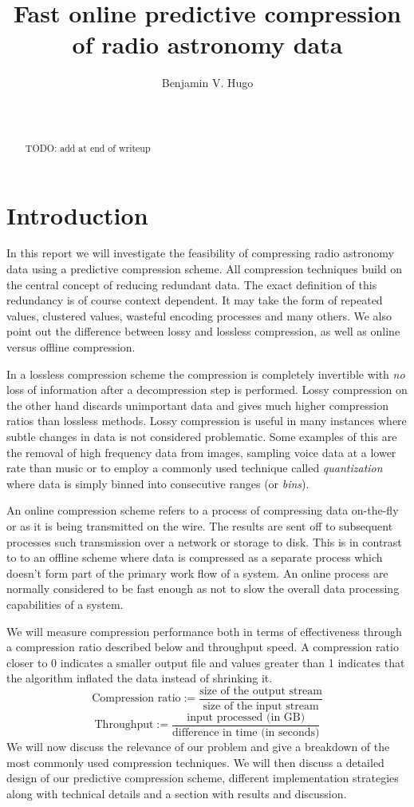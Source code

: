 \documentclass{acm_proc_article-sp}
\title{Fast online predictive compression of radio astronomy data}
\author{
\alignauthor
Benjamin V. Hugo\\
       \affaddr{Department of Computer Science}\\
       \affaddr{University of Cape Town}\\
       \email{bennahugo@aol.com}
}
\begin{document}
\maketitle
\begin{abstract}
 {\color{red}TODO: add at end of writeup}
\end{abstract}

\section{Introduction}
In this report we will investigate the feasibility of compressing radio astronomy data using a predictive compression scheme. All compression techniques
build on the central concept of reducing redundant data. The exact definition of this redundancy is of course context dependent. It may take the form of 
repeated values, clustered values, wasteful encoding processes and many others. We also point out the difference between lossy and lossless compression, as
well as online versus offline compression.

In a lossless compression scheme the compression is completely invertible with \textit{no} loss of information after a decompression step is performed. Lossy
compression on the other hand discards unimportant data and gives much higher compression ratios than lossless methods. Lossy compression is useful in many
instances where subtle changes in data is not considered problematic. Some examples of this are the removal of high frequency data from images, sampling 
voice data at a lower rate than music or to employ a commonly used technique called \textit{quantization} where data is simply binned into consecutive ranges 
(or \textit{bins}).

An online compression scheme refers to a process of compressing data on-the-fly or as it is being transmitted on the wire. The results are sent off to subsequent 
processes such transmission over a network or storage to disk. This is in contrast to to an offline scheme where data is compressed as a separate process which doesn't
form part of the primary work flow of a system. An online process are normally considered to be fast enough as not to slow the overall data processing capabilities of 
a system.

We will measure compression performance both in terms of effectiveness through a compression ratio described below \cite[p. 10]{salomon2004data} and throughput speed. A 
compression ratio closer to 0 indicates a smaller output file and values greater than 1 indicates that the algorithm inflated the data instead of shrinking it.
\begin{equation}
 \text{Compression ratio} := \frac{\text{size of the output stream}}{\text{size of the input stream}}
\end{equation}
\begin{equation}
 \text{Throughput} := \frac{\text{input processed (in GB)}}{\text{difference in time (in seconds)}}
\end{equation}
We will now discuss the relevance of our problem and give a breakdown of the most commonly used compression techniques. We will then discuss a detailed design
of our predictive compression scheme, different implementation strategies along with technical details and a section with results and discussion.
\end{document}
